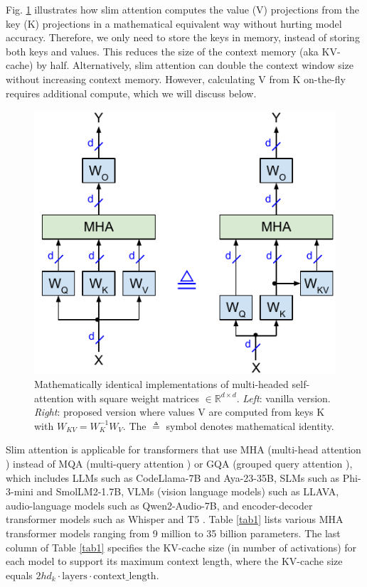 \documentclass{article}
\newcommand{\eR}[2]{$\in \mathbb{R}^{#1 \times #2}$} %
\begin{document}
Fig. \ref{fig1} illustrates how slim attention computes the value (V) projections from the key (K) projections in a mathematical equivalent way without hurting model accuracy. Therefore, we only need to store the keys in memory, instead of storing both keys and values. This reduces the size of the context memory (aka KV-cache) by half. Alternatively, slim attention can double the context window size without increasing context memory. However, calculating V from K on-the-fly requires additional compute, which we will discuss below.
\begin{figure}[h!] \centering  %
  \includegraphics[scale=0.88]{../doc/fig/slimAttn_fig1.pdf}
  \caption{Mathematically identical implementations of multi-headed self-attention with square weight matrices \eR{d}{d}. \emph{Left}: vanilla version. \emph{Right}: proposed version where values V are computed from keys K with $W_{KV} = W_K^{-1} W_V$. The $\triangleq$ symbol denotes mathematical identity.}
\label{fig1} \end{figure}

Slim attention is applicable for transformers that use MHA (multi-head attention \citep{vanilla}) instead of MQA (multi-query attention \citep{MQA}) or GQA (grouped query attention \citep{GQA}), which includes LLMs such as CodeLlama-7B and Aya-23-35B, SLMs such as Phi-3-mini and SmolLM2-1.7B, VLMs (vision language models) such as LLAVA, audio-language models such as Qwen2-Audio-7B, and encoder-decoder transformer models such as Whisper \citep{whisper} and T5 \citep{T5}. Table \ref{tab1} lists various MHA transformer models ranging from 9 million to 35 billion parameters. The last column of Table \ref{tab1} specifies the KV-cache size (in number of activations) for each model to support its maximum context length, where the KV-cache size equals $2 h d_k \cdot \text{layers} \cdot \text{context\_length}$.
\end{document}
